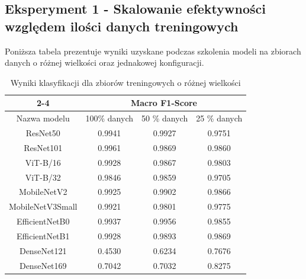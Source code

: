 \subsection{ Eksperyment 1 - Skalowanie efektywności względem ilości danych treningowych}
Poniższa tabela prezentuje wyniki uzyskane podczas szkolenia modeli na zbiorach danych o różnej wielkości oraz jednakowej konfiguracji.
\begin{table}[H]
	\centering
	\begin{tabular}{c|ccc|}
		\cline{2-4}
		& \multicolumn{3}{c|}{Macro F1-Score}                                                  \\ \hline
		\multicolumn{1}{|c|}{Nazwa modelu}     & \multicolumn{1}{c|}{100\% danych} & \multicolumn{1}{c|}{50 \% danych} & 25 \% danych \\ \hline
		\multicolumn{1}{|c|}{ResNet50}         & \multicolumn{1}{c|}{0.9941}            & \multicolumn{1}{c|}{0.9927}            & 0.9751            \\ \hline
		\multicolumn{1}{|c|}{ResNet101}        & \multicolumn{1}{c|}{0.9961}            & \multicolumn{1}{c|}{0.9869}            & 0.9860           \\ \hline
		\multicolumn{1}{|c|}{ViT-B/16}         & \multicolumn{1}{c|}{0.9928}            & \multicolumn{1}{c|}{0.9867}            & 0.9803           \\ \hline
		\multicolumn{1}{|c|}{ViT-B/32}         & \multicolumn{1}{c|}{0.9846}            & \multicolumn{1}{c|}{0.9859}            & 0.9705            \\ \hline
		\multicolumn{1}{|c|}{MobileNetV2}      & \multicolumn{1}{c|}{0.9925}            & \multicolumn{1}{c|}{0.9902}            & 0.9866            \\ \hline
		\multicolumn{1}{|c|}{MobileNetV3Small} & \multicolumn{1}{c|}{0.9921}            & \multicolumn{1}{c|}{0.9801}            & 0.9775            \\ \hline
		\multicolumn{1}{|c|}{EfficientNetB0}   & \multicolumn{1}{c|}{0.9937}            & \multicolumn{1}{c|}{0.9956}            & 0.9855            \\ \hline
		\multicolumn{1}{|c|}{EfficientNetB1}   & \multicolumn{1}{c|}{0.9928}            & \multicolumn{1}{c|}{0.9893}            & 0.9869            \\ \hline
		\multicolumn{1}{|c|}{DenseNet121}   & \multicolumn{1}{c|}{0.4530}            & \multicolumn{1}{c|}{0.6234}            & 0.7676            \\ \hline	
				\multicolumn{1}{|c|}{DenseNet169}   & \multicolumn{1}{c|}{0.7042}            & \multicolumn{1}{c|}{0.7032}            & 0.8275            \\ \hline	
			
\end{tabular}
\caption{Wyniki klasyfikacji dla zbiorów treningowych o różnej wielkości}
\label{tab:model_less data}
\end{table}

